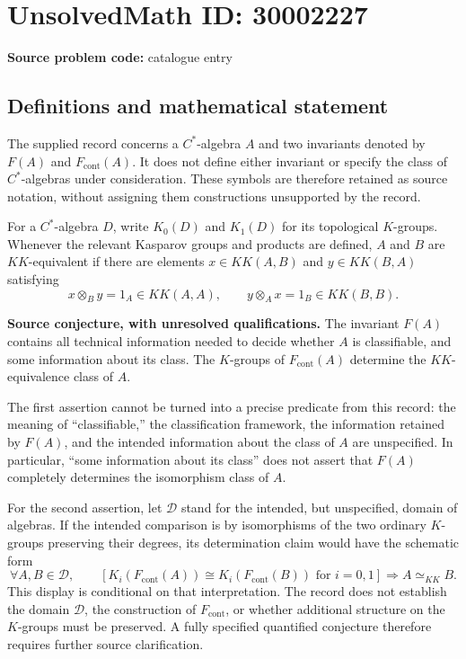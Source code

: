 \documentclass[11pt]{article}
\begin{document}
\section*{UnsolvedMath ID: 30002227}
\textbf{Source problem code:} catalogue entry
\subsection{Definitions and mathematical statement}
The supplied record concerns a \(C^*\)-algebra \(A\) and two invariants denoted by \(F(A)\) and \(F_{\mathrm{cont}}(A)\). It does not define either invariant or specify the class of \(C^*\)-algebras under consideration. These symbols are therefore retained as source notation, without assigning them constructions unsupported by the record.

For a \(C^*\)-algebra \(D\), write \(K_0(D)\) and \(K_1(D)\) for its topological \(K\)-groups. Whenever the relevant Kasparov groups and products are defined, \(A\) and \(B\) are \(KK\)-equivalent if there are elements \(x\in KK(A,B)\) and \(y\in KK(B,A)\) satisfying
\[
 x\otimes_B y=1_A\in KK(A,A),\qquad
 y\otimes_A x=1_B\in KK(B,B).
\]

\textbf{Source conjecture, with unresolved qualifications.} The invariant \(F(A)\) contains all technical information needed to decide whether \(A\) is classifiable, and some information about its class. The \(K\)-groups of \(F_{\mathrm{cont}}(A)\) determine the \(KK\)-equivalence class of \(A\).

The first assertion cannot be turned into a precise predicate from this record: the meaning of ``classifiable,'' the classification framework, the information retained by \(F(A)\), and the intended information about the class of \(A\) are unspecified. In particular, ``some information about its class'' does not assert that \(F(A)\) completely determines the isomorphism class of \(A\).

For the second assertion, let \(\mathcal D\) stand for the intended, but unspecified, domain of algebras. If the intended comparison is by isomorphisms of the two ordinary \(K\)-groups preserving their degrees, its determination claim would have the schematic form
\[
 \forall A,B\in\mathcal D,\qquad
 \left[
 K_i\!\left(F_{\mathrm{cont}}(A)\right)
 \cong K_i\!\left(F_{\mathrm{cont}}(B)\right)
 \text{ for }i=0,1
 \right]
 \Longrightarrow A\simeq_{KK}B.
\]
This display is conditional on that interpretation. The record does not establish the domain \(\mathcal D\), the construction of \(F_{\mathrm{cont}}\), or whether additional structure on the \(K\)-groups must be preserved. A fully specified quantified conjecture therefore requires further source clarification.
\end{document}
